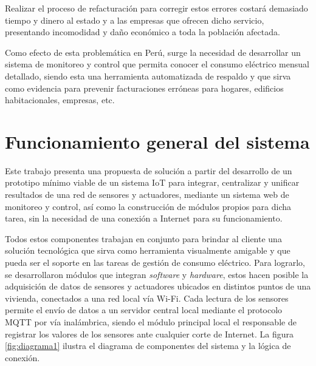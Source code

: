 Realizar el proceso de refacturación para corregir estos errores costará demasiado tiempo y dinero al estado y a las empresas que ofrecen dicho servicio, presentando incomodidad y daño económico a toda la población afectada. 

Como efecto de esta problemática en Perú, surge la necesidad de desarrollar un sistema de monitoreo y control que permita conocer el consumo eléctrico mensual detallado, siendo esta una herramienta automatizada de respaldo y que sirva como evidencia para prevenir facturaciones erróneas para hogares, edificios habitacionales, empresas, etc.




\section{Funcionamiento general del sistema}

Este trabajo presenta una propuesta de solución a partir del desarrollo de un prototipo mínimo viable de un sistema IoT para integrar, centralizar y unificar resultados de una red de sensores y actuadores, mediante un sistema web de monitoreo y control, así como la construcción de módulos propios para dicha tarea, sin la necesidad de una conexión a Internet para su funcionamiento. 

Todos estos componentes trabajan en conjunto para brindar al cliente una solución tecnológica que sirva como herramienta visualmente amigable y que pueda ser el soporte en las tareas de gestión de consumo eléctrico. Para lograrlo, se desarrollaron módulos que integran \emph{software} y \emph{hardware}, estos hacen posible la adquisición de datos de sensores y actuadores ubicados en distintos puntos de una vivienda, conectados a una red local vía Wi-Fi. Cada lectura de los sensores permite el envío de datos a un servidor central local mediante el protocolo MQTT por vía inalámbrica, siendo el módulo principal local el responsable de registrar los valores de los sensores ante cualquier corte de Internet. La figura \ref{fig:diagrama1} ilustra el diagrama de componentes del sistema y la lógica de conexión.

